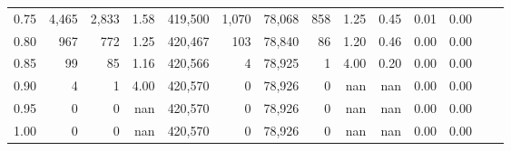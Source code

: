 \begin{tabular}{rrrrrrrrrrrrrr}
0.75 &   4,465 &   2,833 &    1.58 &  419,500 &    1,070 &  78,068 &     858 &  1.25 &  0.45 &  0.01 &      0.00 \\
0.80 &     967 &     772 &    1.25 &  420,467 &      103 &  78,840 &      86 &  1.20 &  0.46 &  0.00 &      0.00 \\
0.85 &      99 &      85 &    1.16 &  420,566 &        4 &  78,925 &       1 &  4.00 &  0.20 &  0.00 &      0.00 \\
0.90 &       4 &       1 &    4.00 &  420,570 &        0 &  78,926 &       0 &   nan &   nan &  0.00 &      0.00 \\
0.95 &       0 &       0 &     nan &  420,570 &        0 &  78,926 &       0 &   nan &   nan &  0.00 &      0.00 \\
1.00 &       0 &       0 &     nan &  420,570 &        0 &  78,926 &       0 &   nan &   nan &  0.00 &      0.00 \\
\bottomrule
\end{tabular}

